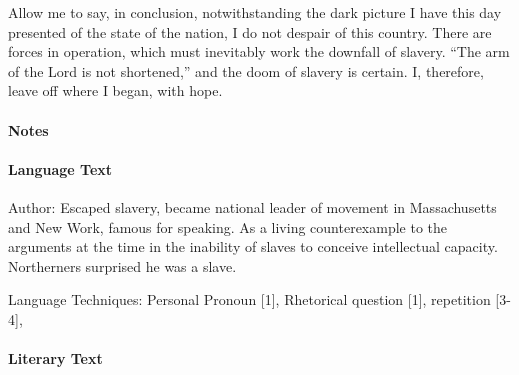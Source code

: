 \documentclass[a4paper,12pt]{article}
\begin{document}
\begin{linenumbers}
 Allow me to say, in conclusion, notwithstanding the dark picture I have this day presented of the state of the nation, I do not despair of this country. There are forces in operation, which must inevitably work the downfall of slavery. “The arm of the Lord is not shortened,” and the doom of slavery is certain. I, therefore, leave off where I began, with hope.
\end{linenumbers}

\newpage

\paragraph{Notes}

\paragraph{Language Text}

Author: Escaped slavery, became national leader of movement in Massachusetts and New Work, famous for speaking. As a living counterexample to the arguments at the time in the inability of slaves to conceive intellectual capacity. Northerners surprised he was a slave.



Language Techniques: Personal Pronoun [1], Rhetorical question [1], repetition [3-4],


\paragraph{Literary Text}
\end{document}
